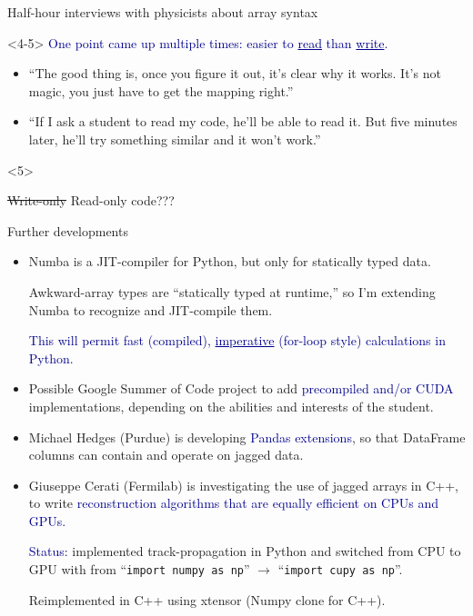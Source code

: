 \documentclass[aspectratio=169]{beamer}
\begin{document}
\begin{frame}{Half-hour interviews with physicists about array syntax}
\begin{onlyenv}<4-5>
\textcolor{darkblue}{One point came up multiple times: easier to \underline{read} than \underline{write}.}
\small
\begin{itemize}
\item ``The good thing is, once you figure it out, it's clear why it works. It's not magic, you just have to get the mapping right.''
\item ``If I ask a student to read my code, he'll be able to read it. But five minutes later, he'll try something similar and it won't work.''
\end{itemize}

\begin{uncoverenv}<5>
\begin{center}
\large \sout{Write-only} Read-only code???
\end{center}
\end{uncoverenv}
\vspace{1 cm}
\end{onlyenv}
\end{frame}

\begin{frame}{Further developments}
\vspace{0.2 cm}
\begin{itemize}\setlength{\itemsep}{0.35 cm}
\item<1-> Numba is a JIT-compiler for Python, but only for statically typed data.

Awkward-array types are ``statically typed at runtime,'' so I'm extending Numba to recognize and JIT-compile them.

\vspace{0.1 cm}
\textcolor{darkblue}{This will permit fast (compiled), \underline{imperative} (for-loop style) calculations in Python.}

\item<2-> Possible Google Summer of Code project to add \textcolor{darkblue}{precompiled and/or CUDA} implementations, depending on the abilities and interests of the student.

\item<3-> Michael Hedges (Purdue) is developing \textcolor{darkblue}{Pandas extensions}, so that DataFrame columns can contain and operate on jagged data.

\item<4-> Giuseppe Cerati (Fermilab) is investigating the use of jagged arrays in C++, to write \textcolor{darkblue}{reconstruction algorithms that are equally efficient on CPUs and GPUs.}

\vspace{0.1 cm}
\textcolor{darkblue}{Status:} implemented track-propagation in Python and switched from CPU to GPU with from ``{\tt \small import numpy as np}'' $\to$ ``{\tt \small import cupy as np}''.

\vspace{0.1 cm}
Reimplemented in C++ using xtensor (Numpy clone for C++).
\end{itemize}
\end{frame}
\end{document}
